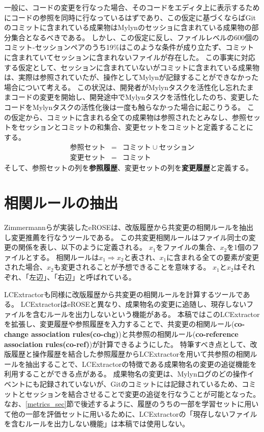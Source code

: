 \documentclass[a4paper]{jsbook}
\def\Ra{\Rightarrow}
\begin{document}
一般に、コードの変更を行なった場合、そのコードをエディタ上に表示するためにコードの参照を同時に行なっているはずであり、この仮定に基づくならばGitのコミットに含まれている成果物はMylynのセッショに含まれている成果物の部分集合となるべきである。
しかし、この仮定に反し、ファイルレベルの600個のコミット-セッションペアのうち19\%はこのような条件が成り立たず、コミットに含まれていてセッションに含まれないファイルが存在した。
この事実に対応する仮定として、セッションに含まれていないがコミットに含まれている成果物は、実際は参照されていたが、操作としてMylynが記録することができなかった場合について考える。
この状況は、開発者がMylynタスクを活性化し忘れたままコードの変更を開始し、開発途中でMylynタスクを活性化したのち、変更したコードをMylynタスクの活性化後は一度も触らなかった場合に起こりうる。
この仮定から、コミットに含まれる全ての成果物は参照されたとみなし、参照セットをセッションとコミットの和集合、変更セットをコミットと定義することにする。
\begin{eqnarray}
  参照セット &=& コミット \cup セッション\\
  変更セット &=&  コミット
\end{eqnarray}
そして、参照セットの列を{\bf 参照履歴}、変更セットの列を{\bf 変更履歴}と定義する。
\section{相関ルールの抽出}\label{extractrules_sec}
Zimmermannらが実装したeROSE\cite{Zimmermann:2005}は、改版履歴から共変更の相関ルールを抽出し変更推薦を行なうツールである。
この共変更相関ルールはファイル同士の変更の関係を表し、以下のように定義される。
$x_1$をファイルの集合、$x_2$を1個のファイルとする。
相関ルールは$x_1 \Ra x_2$と表され、$x_1$に含まれる全ての要素が変更された場合、$x_2$も変更されることが予想できることを意味する。
$x_1$と$x_2$はそれぞれ、「左辺」、「右辺」と呼ばれている。

LCExtractor\cite{Hagward:2015,Mori:2015}も同様に改版履歴から共変更の相関ルールを計算するツールである。
LCExtractorはeROSEと異なり、成果物名の変更に追随し、現存しないファイルを含むルールを出力しないという機能がある。
本稿ではこのLCExtractorを拡張し、変更履歴や参照履歴を入力することで、共変更の相関ルール({\bf co-change association rules(co-chg)})と共参照の相関ルール({\bf co-reference association rules(co-ref)})が計算できるようにした。
特筆すべき点として、改版履歴と操作履歴を結合した参照履歴からLCExtractorを用いて共参照の相関ルールを抽出することで、LCExtractorの特徴である成果物名の変更の追従機能を利用することができる点がある。
成果物名の変更は、Mylynログのどの操作イベントにも記録されていないが、Gitのコミットには記録されているため、コミットとセッションを結合させることで変更の追従を行なうことが可能となった。
なお、\ref{metrics_sec}節で後述するように、履歴のうちの一部を学習セットに用いて他の一部を評価セットに用いるために、LCExtractorの「現存しないファイルを含むルールを出力しない機能」は本稿では使用しない。
\end{document}
